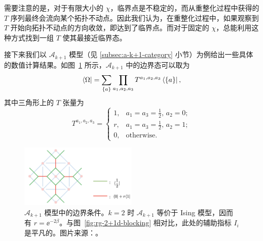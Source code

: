 需要注意的是，对于有限大小的 $\chi$，临界点是不稳定的，而从重整化过程中获得的 $T$ 序列最终会流向某个拓扑不动点。因此我们认为，在重整化过程中，如果观察到 $T$ 开始向拓扑不动点的方向收敛，即达到了临界点。而对于固定的 $\chi$，总能利用这种方式找到一组 $T$ 使其最接近临界态。


接下来我们以 $\mathcal{A}_{k+1}$ 模型（见 \ref{subsec:a-k+1-category} 小节）为例给出一些具体的数值计算结果。如图~\ref{fig:a-k+1-boundary-condition} 所示，$\mathcal{A}_{k+1}$ 中的边界态可以取为
\begin{equation}
  \bra{\Omega} = \sum_{\{a\}} \prod_{a_1, a_2, a_3} T^{a_1, a_2, a_3} \bra{\{a\}},
\end{equation}
其中三角形上的 $T$ 张量为
\begin{equation}
  T^{a_1, a_2, a_3} = \begin{cases}
    1, & a_1 = a_3 = \frac12, \, a_2 = 0; \\
    r, & a_1 = a_3 = \frac12, \, a_2 = 1; \\
    0, & \text{otherwise}.
  \end{cases}
\end{equation}

\begin{figure}[htb]
  \centering
  \includegraphics[width=0.5\textwidth]{images/holographic/a-k+1-boundary-condition.png}
  \caption[$\mathcal{A}_{k+1}$ 模型中的边界条件]{$\mathcal{A}_{k+1}$ 模型中的边界条件。$k=2$ 时 $\mathcal{A}_{k+1}$ 等价于 Ising 模型，因而有 $r=\ee^{-2\beta}$。与图~\ref{fig:rg-2+1d-blocking} 相对比，此处的辅助指标 $I_i$ 是平凡的。图片来源：\parencite{chen2022exact}。}
  \label{fig:a-k+1-boundary-condition}
\end{figure}

